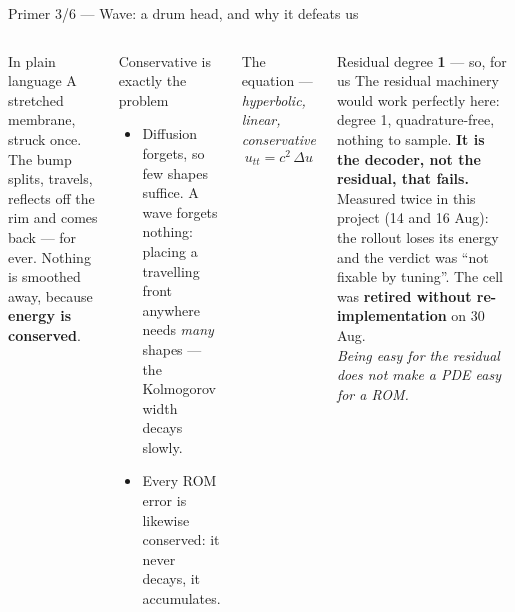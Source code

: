 \documentclass[10pt,aspectratio=169]{beamer}
\begin{document}
\begin{frame}{Primer 3/6 --- Wave: a drum head, and why it defeats us}
  \footnotesize
  \begin{columns}[T]
    \begin{block}{In plain language}
      A stretched membrane, struck once. The bump splits, travels, reflects off the rim and comes
      back --- for ever. Nothing is smoothed away, because \textbf{energy is conserved}.
    \end{block}
    \begin{alertblock}{Conservative is exactly the problem}
      \begin{itemize}
        \item Diffusion forgets, so few shapes suffice. A wave forgets nothing: placing a travelling
          front anywhere needs \emph{many} shapes --- the Kolmogorov width decays slowly.
        \item Every ROM error is likewise conserved: it never decays, it accumulates.
      \end{itemize}
    \end{alertblock}
    \begin{block}{The equation --- \emph{hyperbolic, linear, conservative}}
      \[ u_{tt} = c^{2}\,\Delta u \]
    \end{block}
    \begin{exampleblock}{Residual degree \textbf{1} --- so, for us}
      The residual machinery would work perfectly here: degree 1, quadrature-free, nothing to sample.
      \textbf{It is the decoder, not the residual, that fails.} Measured twice in this project
      (14 and 16 Aug): the rollout loses its energy and the verdict was ``not fixable by tuning''.
      The cell was \textbf{retired without re-implementation} on 30 Aug.\\[3pt]
      \emph{Being easy for the residual does not make a PDE easy for a ROM.}
    \end{exampleblock}
  \end{columns}
\end{frame}
\end{document}

